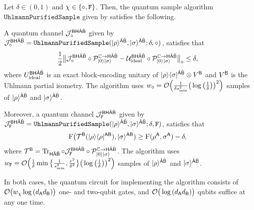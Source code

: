 \begin{theorem}
\label{thm:algorithm Uhlmann}
Let $\delta \in (0, 1)$ and $\chi \in \{\diamond, \mathtt{F}\}$. Then, the quantum sample algorithm $\mathtt{UhlmannPurifiedSample}$ given by  satisfies the following.

A quantum channel ${\mathcal{J}}_\diamond^{{\mathsf{B}}{\mathsf{H}}\hat{{\mathsf{A}}}\hat{{\mathsf{B}}}}$ given by ${\mathcal{J}}_\diamond^{{\mathsf{B}}{\mathsf{H}}\hat{{\mathsf{A}}}\hat{{\mathsf{B}}}} = \mathtt{UhlmannPurifiedSample}(|\rho\rangle^{\hat{{\mathsf{A}}}\hat{{\mathsf{B}}}}, |\sigma\rangle^{\hat{{\mathsf{A}}}\hat{{\mathsf{B}}}}; \delta, \diamond)$,
satisfies that
\begin{equation}
    \frac{1}{2}\big\|{\mathcal{J}}_\diamond^{{\mathsf{B}}{\mathsf{H}}\hat{{\mathsf{A}}}\hat{{\mathsf{B}}}} \circ{\mathcal{P}}_{|0\rangle|\sigma\rangle}^{\mathbb{C}\rightarrow{\mathsf{H}}\hat{{\mathsf{A}}}\hat{{\mathsf{B}}}} - {\mathcal{U}}_{\rm ideal}^{{\mathsf{B}}{\mathsf{H}}\hat{{\mathsf{A}}}\hat{{\mathsf{B}}}}\circ{\mathcal{P}}_{|0\rangle|\sigma\rangle}^{\mathbb{C}\rightarrow{\mathsf{H}}\hat{{\mathsf{A}}}\hat{{\mathsf{B}}}}\big\|_\diamond \leq \delta,
\end{equation}
where $U_{\rm ideal}^{{\mathsf{B}}{\mathsf{H}}\hat{{\mathsf{A}}}\hat{{\mathsf{B}}}}$ is an exact block-encoding unitary of $|\rho\rangle\langle\sigma|^{\hat{{\mathsf{A}}}\hat{{\mathsf{B}}}} \otimes V^{\mathsf{B}}$ and $V^{\mathsf{B}}$ is the Uhlmann partial isometry.
The algorithm uses $w_\diamond = {\mathcal{O}}\Big(\frac{1}{\delta s_{\rm min}^2}\big(\log{\big(\frac{1}{\delta}\big)}\big)^2\Big)$ samples of $|\rho\rangle^{\hat{{\mathsf{A}}}\hat{{\mathsf{B}}}}$ and $|\sigma\rangle^{\hat{{\mathsf{A}}}\hat{{\mathsf{B}}}}$.

Moreover, a quantum channel ${\mathcal{J}}_{\mathtt{F}}^{{\mathsf{B}}{\mathsf{H}}\hat{{\mathsf{A}}}\hat{{\mathsf{B}}}}$ given by ${\mathcal{J}}_{\mathtt{F}}^{{\mathsf{B}}{\mathsf{H}}\hat{{\mathsf{A}}}\hat{{\mathsf{B}}}} = \mathtt{UhlmannPurifiedSample}(|\rho\rangle^{\hat{{\mathsf{A}}}\hat{{\mathsf{B}}}}, |\sigma\rangle^{\hat{{\mathsf{A}}}\hat{{\mathsf{B}}}}; \delta, \mathtt{F})$,
satisfies that
\begin{align}
        {\mathrm{F}}\big({\mathcal{T}}^{\mathsf{B}}(|\rho\rangle\langle\rho|^{{\mathsf{A}}{\mathsf{B}}}), |\sigma\rangle^{{\mathsf{A}}{\mathsf{B}}}) \geq {\mathrm{F}}(\rho^{\mathsf{A}}, \sigma^{\mathsf{A}}) - \delta,
\end{align}
where ${\mathcal{T}}^{\mathsf{B}} = \operatorname{Tr}_{{\mathsf{H}}\hat{{\mathsf{A}}}\hat{{\mathsf{B}}}}\circ{\mathcal{J}}_{\mathtt{F}}^{{\mathsf{B}}{\mathsf{H}}\hat{{\mathsf{A}}}\hat{{\mathsf{B}}}}\circ{\mathcal{P}}_{|0\rangle|\sigma\rangle}^{\mathbb{C}\rightarrow{\mathsf{H}}\hat{{\mathsf{A}}}\hat{{\mathsf{B}}}}$.
The algorithm uses $w_{\mathtt{F}} = {\mathcal{O}}\Big(\frac{1}{\delta}\min\big\{\frac{1}{s_{\rm min}^2}, \frac{r^2}{\delta^2}\big\}\big(\log{\big(\frac{1}{\delta}\big)}\big)^2\Big)$ samples of $|\rho\rangle^{\hat{{\mathsf{A}}}\hat{{\mathsf{B}}}}$ and $|\sigma\rangle^{\hat{{\mathsf{A}}}\hat{{\mathsf{B}}}}$.

In both cases, the quantum circuit for implementing the algorithm consists of ${\mathcal{O}}\big(w_\chi \log{(d_{\mathsf{A}}d_{\mathsf{B}})}\big)$ one- and two-qubit gates, and ${\mathcal{O}}\big(\log{(d_{\mathsf{A}}d_{\mathsf{B}})}\big)$ qubits suffice at any one time.
\end{theorem}




